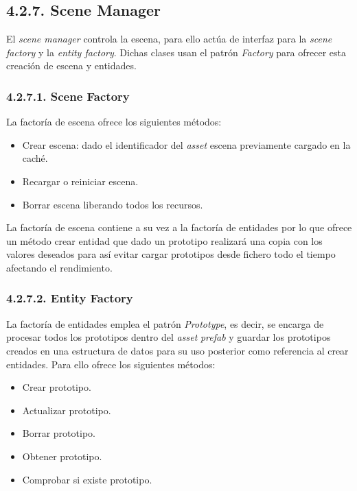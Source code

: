 \subsection*{4.2.7. Scene Manager}\label{sec:workflow_managers_scene}

El \textit{scene manager} controla la escena, para ello actúa de interfaz para la \textit{scene factory} y la \textit{entity factory}.
Dichas clases usan el patrón \textit{Factory}\cite{factory-pattern} para ofrecer esta creación de escena y entidades.

\subsubsection*{4.2.7.1. Scene Factory}\label{sec:workflow_managers_scene_factory}

La factoría de escena ofrece los siguientes métodos:
\begin{itemize}
    \item Crear escena: dado el identificador del \textit{asset} escena previamente cargado en la caché.
    \item Recargar o reiniciar escena.
    \item Borrar escena liberando todos los recursos.
\end{itemize}
La factoría de escena contiene a su vez a la factoría de entidades por lo que ofrece un método crear entidad que dado
un prototipo realizará una copia con los valores deseados para así evitar cargar prototipos desde fichero todo el tiempo
afectando el rendimiento.

\subsubsection*{4.2.7.2. Entity Factory}\label{sec:workflow_managers_entity_factory}

La factoría de entidades emplea el patrón \textit{Prototype}\cite{prototype-pattern}, es decir, se encarga de procesar
todos los prototipos dentro del \textit{asset} \textit{prefab} y guardar los prototipos creados en una estructura de datos 
para su uso posterior como referencia al crear entidades. Para ello ofrece los siguientes métodos:
\begin{itemize}
    \item Crear prototipo.
    \item Actualizar prototipo.
    \item Borrar prototipo.
    \item Obtener prototipo.
    \item Comprobar si existe prototipo.
\end{itemize}

